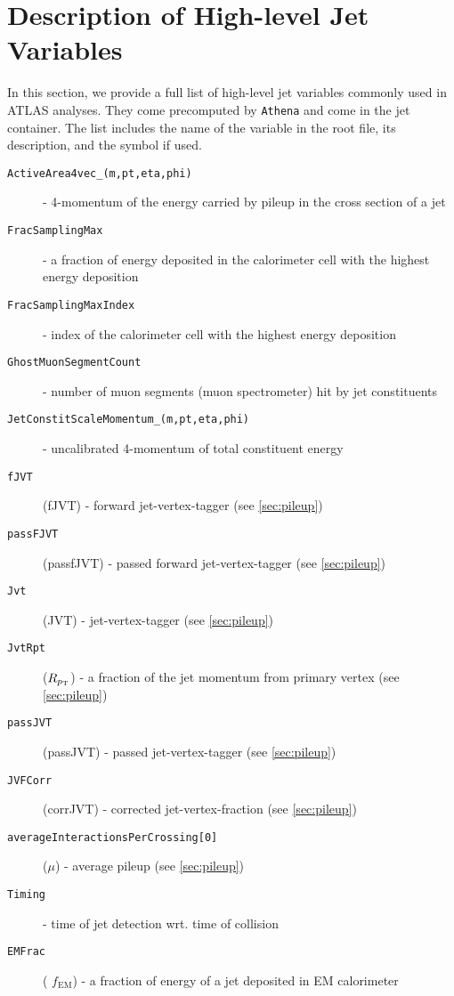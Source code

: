 \chapter{Description of High-level Jet Variables}
\label{ch:app_high_level_variables}
In this section, we provide a full list of high-level jet variables commonly used in ATLAS analyses. 
They come precomputed by \texttt{Athena} and come in the jet container. 
The list includes the name of the variable in the root file, its description, and the symbol if used.
\begin{description}
    \item[\texttt{ActiveArea4vec\_(m,pt,eta,phi)}]  -  4-momentum of the energy carried by pileup in the cross section of a jet
    \item[\texttt{FracSamplingMax}]  -  a fraction of energy deposited in the calorimeter cell with the highest energy deposition
    \item[\texttt{FracSamplingMaxIndex}]  -  index of the calorimeter cell with the highest energy deposition 
    \item[\texttt{GhostMuonSegmentCount}]  -  number of muon segments (muon spectrometer) hit by jet constituents
    \item[\texttt{JetConstitScaleMomentum\_(m,pt,eta,phi)}]  -  uncalibrated 4-momentum of total constituent energy
    \item[\texttt{fJVT}]  (fJVT) -  forward jet-vertex-tagger (see \cref{sec:pileup})
    \item[\texttt{passFJVT}]  (passfJVT) -  passed forward jet-vertex-tagger (see \cref{sec:pileup})
    \item[\texttt{Jvt}]  (JVT) -  jet-vertex-tagger (see \cref{sec:pileup}) 
    \item[\texttt{JvtRpt}]  ($R_{p_\text{T}}$) - a fraction of the jet momentum from primary vertex (see \cref{sec:pileup})
    \item[\texttt{passJVT}]  (passJVT) -  passed jet-vertex-tagger (see \cref{sec:pileup})
    \item[\texttt{JVFCorr}]  (corrJVT) -  corrected jet-vertex-fraction (see \cref{sec:pileup}) 
    \item[\texttt{averageInteractionsPerCrossing[0]}]  ($\mu$) -  average pileup (see \cref{sec:pileup})
    \item[\texttt{Timing}]  -  time of jet detection wrt. time of collision
    \item[\texttt{EMFrac}]  ( $f_{\text{EM}}$) -  a fraction of energy of a jet deposited in EM calorimeter 

\end{description}
